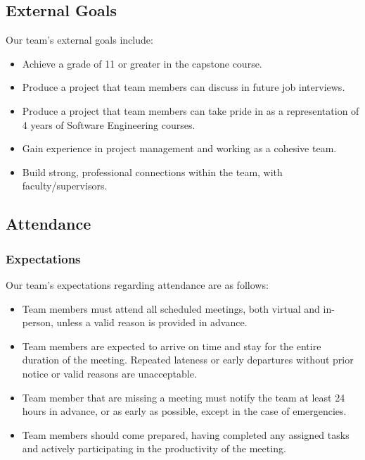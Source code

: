 \documentclass{article}
\begin{document}
\subsection*{External Goals}

Our team's external goals include:

\begin{itemize}
    \item Achieve a grade of 11 or greater in the capstone course.
    \item Produce a project that team members can discuss in future job interviews.
    \item Produce a project that team members can take pride in as a representation of 4 years of Software Engineering courses.
    \item Gain experience in project management and working as a cohesive team.
    \item Build strong, professional connections within the team, with faculty/supervisors.

\end{itemize}

\subsection*{Attendance}


\subsubsection*{Expectations}

Our team's expectations regarding attendance are as follows:
\begin{itemize}
    \item Team members must attend all scheduled meetings, both virtual and in-person, unless a valid reason is provided in advance.
    \item Team members are expected to arrive on time and stay for the entire duration of the meeting. Repeated lateness or early departures without prior notice or valid reasons are unacceptable.
    \item Team member that are missing a meeting must notify the team at least 24 hours in advance, or as early as possible, except in the case of emergencies.
    \item Team members should come prepared, having completed any assigned tasks and actively participating in the productivity of the meeting.
\end{itemize}
\end{document}

